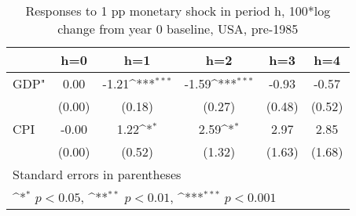 \begin{table}[htbp]\centering
\def\sym#1{\ifmmode^{#1}\else\(^{#1}\)\fi}
\caption{Responses to 1 pp monetary shock in period h, 100*log change from year 0 baseline, USA, pre-1985}
\begin{tabular}{l*{5}{c}}
\hline\hline
            &\multicolumn{1}{c}{h=0}&\multicolumn{1}{c}{h=1}&\multicolumn{1}{c}{h=2}&\multicolumn{1}{c}{h=3}&\multicolumn{1}{c}{h=4}\\
\hline
GDP"        &        0.00         &       -1.21\sym{***}&       -1.59\sym{***}&       -0.93         &       -0.57         \\
            &      (0.00)         &      (0.18)         &      (0.27)         &      (0.48)         &      (0.52)         \\
[1em]
CPI         &       -0.00         &        1.22\sym{*}  &        2.59\sym{*}  &        2.97         &        2.85         \\
            &      (0.00)         &      (0.52)         &      (1.32)         &      (1.63)         &      (1.68)         \\
\hline\hline
\multicolumn{6}{l}{\footnotesize Standard errors in parentheses}\\
\multicolumn{6}{l}{\footnotesize \sym{*} \(p<0.05\), \sym{**} \(p<0.01\), \sym{***} \(p<0.001\)}\\
\end{tabular}
\end{table}

